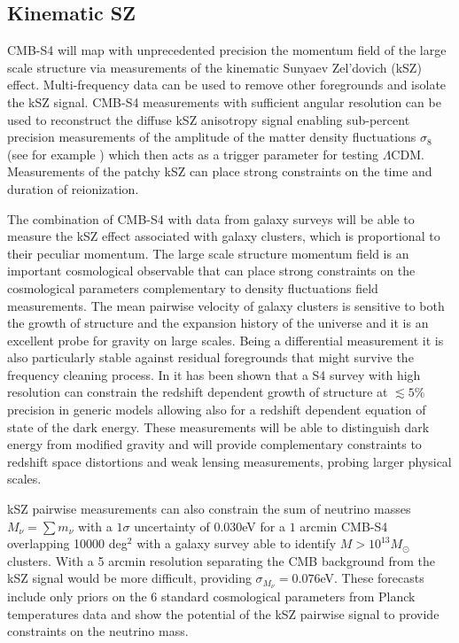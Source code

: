 \subsection{Kinematic SZ}

CMB-S4 will map with unprecedented precision the momentum field of the large scale structure via measurements of the kinematic Sunyaev Zel'dovich (kSZ) effect. Multi-frequency data can be used to remove other foregrounds and isolate the kSZ signal. CMB-S4 measurements with sufficient angular resolution can be used to reconstruct the diffuse kSZ anisotropy signal enabling sub-percent precision measurements of the amplitude of the matter density fluctuations $\sigma_8$ (see for example \cite{Calabrese:2014gwa}) which then acts as a trigger
parameter for testing $\Lambda$CDM. 
Measurements of the patchy kSZ can place strong constraints on the time and duration of reionization.

The combination of CMB-S4 with data from galaxy surveys will be able to measure the kSZ effect associated with galaxy clusters, which is proportional to their peculiar momentum. The large scale structure momentum field is an important cosmological observable that can place strong constraints on the cosmological parameters \cite{Bhattacharya:2007sk,Kosowsky:2009nc,Mueller:2014nsa,Mueller:2014dba} complementary to density fluctuations field measurements. The mean pairwise velocity of galaxy clusters is sensitive to both the growth of structure and the expansion history of the universe and it is an excellent probe for gravity on large scales. Being a differential measurement it is also particularly stable against residual foregrounds that might survive the frequency cleaning process. In \cite{Mueller:2014nsa,Mueller:2014dba} it has been shown that a S4 survey with high resolution can constrain the redshift dependent growth of structure at $\lesssim 5\%$ precision in generic models allowing also for a redshift dependent equation of state of the dark energy. These measurements will be able to distinguish dark energy from modified gravity and will provide complementary constraints to redshift space distortions and weak lensing measurements, probing larger physical scales.

kSZ pairwise measurements can also constrain the sum of neutrino masses $M_{\nu}= \sum m_{\nu}$ with a $1\sigma$ uncertainty of $0.030$eV for a $1$ arcmin CMB-S4 overlapping 10000 deg$^2$ with a galaxy survey able to identify $M>10^{13}M_{\odot}$ clusters. With a 5 arcmin resolution separating the CMB background from the kSZ signal would be more difficult, providing  $\sigma_{M_{\nu}} = 0.076$eV. These forecasts include only priors on the 6 standard cosmological parameters from Planck temperatures data and show the potential of the kSZ pairwise signal to provide constraints on the neutrino mass. 

